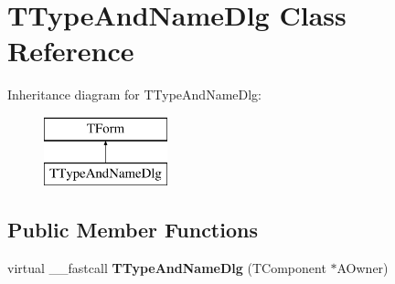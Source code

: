 \hypertarget{class_t_type_and_name_dlg}{\section{T\+Type\+And\+Name\+Dlg Class Reference}
\label{class_t_type_and_name_dlg}
}
Inheritance diagram for T\+Type\+And\+Name\+Dlg\+:\begin{figure}[H]
\begin{center}
\leavevmode
\includegraphics[height=2.000000cm]{class_t_type_and_name_dlg}
\end{center}
\end{figure}
\subsection*{Public Member Functions}
\begin{DoxyCompactItemize}
\item 
\hypertarget{class_t_type_and_name_dlg_aba00abe5b604190d85278a2a10765311}{virtual \+\_\+\+\_\+fastcall {\bfseries T\+Type\+And\+Name\+Dlg} (T\+Component $\ast$A\+Owner)}\label{class_t_type_and_name_dlg_aba00abe5b604190d85278a2a10765311}

\end{DoxyCompactItemize}
